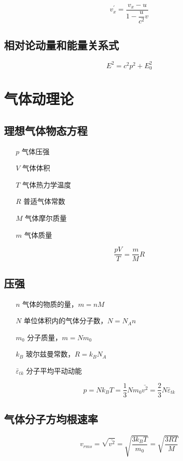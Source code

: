\documentclass{article}
\begin{document}
\[v_x^\prime=\frac{v_x-u}{1-\dfrac u{c^2}v}\]

\subsection{相对论动量和能量关系式}

\[E^2=c^2p^2+E_0^2\]

\section{气体动理论}

\subsection{理想气体物态方程}

\begin{enumerate}
    \item[$p$] 气体压强
    \item[$V$] 气体体积
    \item[$T$] 气体热力学温度
    \item[$R$] 普适气体常数
    \item[$M$] 气体摩尔质量
    \item[$m$] 气体质量
\end{enumerate}

\[\frac{pV}T=\frac mMR\]

\subsection{压强}

\begin{enumerate}
    \item[$n$] 气体的物质的量，$m=nM$
    \item[$N$] 单位体积内的气体分子数，$N=N_An$
    \item[$m_0$] 分子质量，$m=Nm_0$
    \item[$k_B$] 玻尔兹曼常数，$R=k_BN_A$
    \item[$\bar\varepsilon_{tk}$] 分子平均平动动能
\end{enumerate}

\[p=Nk_BT=\frac13Nm_0\bar{v^2}=\frac23N\bar\varepsilon_{tk}\]

\subsection{气体分子方均根速率}

\[v_{rms}=\sqrt{\bar{v^2}}=\sqrt{\frac{3k_BT}{m_0}}=\sqrt{\frac{3RT}M}\]
\end{document}
